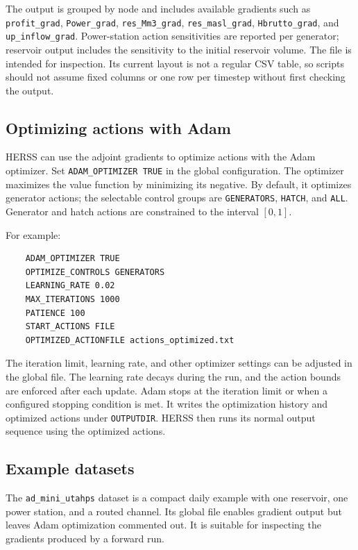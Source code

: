 \documentclass[a4paper, 12pt]{report}
\begin{document}
The output is grouped by node and includes available gradients such as
\texttt{profit\_grad}, \texttt{Power\_grad}, \texttt{res\_Mm3\_grad},
\texttt{res\_masl\_grad}, \texttt{Hbrutto\_grad}, and
\texttt{up\_inflow\_grad}. Power-station action sensitivities are reported
per generator; reservoir output includes the sensitivity to the initial
reservoir volume. The file is intended for inspection. Its current layout
is not a regular CSV table, so scripts should not assume fixed columns or
one row per timestep without first checking the output.

\subsection{Optimizing actions with Adam}

HERSS can use the adjoint gradients to optimize actions with the Adam
optimizer. Set \texttt{ADAM\_OPTIMIZER TRUE} in the global configuration.
The optimizer maximizes the value function by minimizing its negative. By
default, it optimizes generator actions; the selectable control groups are
\texttt{GENERATORS}, \texttt{HATCH}, and \texttt{ALL}. Generator and hatch
actions are constrained to the interval $[0,1]$.

For example:
\begin{verbatim}
	ADAM_OPTIMIZER TRUE
	OPTIMIZE_CONTROLS GENERATORS
	LEARNING_RATE 0.02
	MAX_ITERATIONS 1000
	PATIENCE 100
	START_ACTIONS FILE
	OPTIMIZED_ACTIONFILE actions_optimized.txt
\end{verbatim}
The iteration limit, learning rate, and other optimizer settings can be
adjusted in the global file. The learning rate decays during the run, and
the action bounds are enforced after each update. Adam stops at the iteration
limit or when a configured stopping condition is met. It writes the optimization
history and optimized actions under \texttt{OUTPUTDIR}. HERSS then runs its
normal output sequence using the optimized actions.

\subsection{Example datasets}

The \texttt{ad\_mini\_utahps} dataset is a compact daily example with one
reservoir, one power station, and a routed channel. Its global file enables
gradient output but leaves Adam optimization commented out. It is suitable
for inspecting the gradients produced by a forward run.
\end{document}
